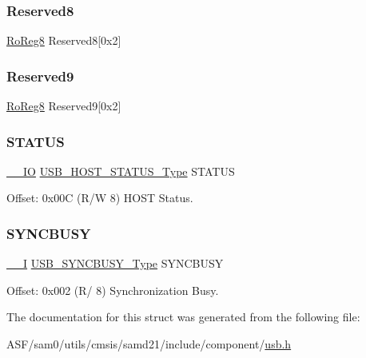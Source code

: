 \subsubsection{\texorpdfstring{Reserved8}{Reserved8}}
{\footnotesize\ttfamily \mbox{\hyperlink{group___s_a_m_d21_e15_a__definitions_ga0d957f1433aaf5d70e4dc2b68288442d}{Ro\+Reg8}} Reserved8\mbox{[}0x2\mbox{]}}

\mbox{\label{struct_usb_host_a7dfdc057ed9939b6708cf88cd831a0cc}} 
\subsubsection{\texorpdfstring{Reserved9}{Reserved9}}
{\footnotesize\ttfamily \mbox{\hyperlink{group___s_a_m_d21_e15_a__definitions_ga0d957f1433aaf5d70e4dc2b68288442d}{Ro\+Reg8}} Reserved9\mbox{[}0x2\mbox{]}}

\mbox{\label{struct_usb_host_a27b024fc9d1a50ffd83cb5a02acaeae4}} 
\subsubsection{\texorpdfstring{STATUS}{STATUS}}
{\footnotesize\ttfamily \mbox{\hyperlink{core__cm0plus_8h_aec43007d9998a0a0e01faede4133d6be}{\+\_\+\+\_\+\+IO}} \mbox{\hyperlink{union_u_s_b___h_o_s_t___s_t_a_t_u_s___type}{U\+S\+B\+\_\+\+H\+O\+S\+T\+\_\+\+S\+T\+A\+T\+U\+S\+\_\+\+Type}} S\+T\+A\+T\+US}



Offset\+: 0x00C (R/W 8) H\+O\+ST Status. 

\mbox{\label{struct_usb_host_a207c0e2e615d2c9a63a3cd1f81d252f7}} 
\subsubsection{\texorpdfstring{SYNCBUSY}{SYNCBUSY}}
{\footnotesize\ttfamily \mbox{\hyperlink{core__cm0plus_8h_af63697ed9952cc71e1225efe205f6cd3}{\+\_\+\+\_\+I}} \mbox{\hyperlink{union_u_s_b___s_y_n_c_b_u_s_y___type}{U\+S\+B\+\_\+\+S\+Y\+N\+C\+B\+U\+S\+Y\+\_\+\+Type}} S\+Y\+N\+C\+B\+U\+SY}



Offset\+: 0x002 (R/ 8) Synchronization Busy. 



The documentation for this struct was generated from the following file\+:\begin{DoxyCompactItemize}
\item 
A\+S\+F/sam0/utils/cmsis/samd21/include/component/\mbox{\hyperlink{component_2usb_8h}{usb.\+h}}\end{DoxyCompactItemize}
